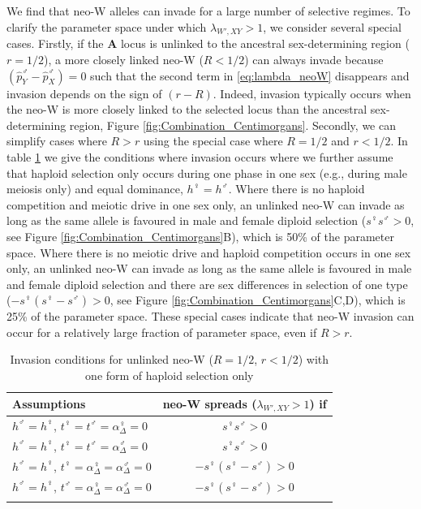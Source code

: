 \documentclass[12pt]{article}
\begin{document}
We find that neo-W alleles can invade for a large number of selective regimes. 
To clarify the parameter space under which $\lambda_{W',XY}>1$, we consider several special cases. 
Firstly, if the \textbf{A} locus is unlinked to the ancestral sex-determining region ($r=1/2$), a more closely linked neo-W ($R<1/2$) can always invade because $\left( \hat{p}^\male_Y-\hat{p}^\male_X \right)=0$ such that the second term in \eqref{eq:lambda_neoW} disappears and invasion depends on the sign of $(r-R)$. 
Indeed, invasion typically occurs when the neo-W is more closely linked to the selected locus than the ancestral sex-determining region, Figure \ref{fig:Combination_Centimorgans}.
Secondly, we can simplify cases where $R>r$ using the special case where $R=1/2$ and $r<1/2$. 
In table \ref{tab:specialcases} we give the conditions where invasion occurs where we further assume that haploid selection only occurs during one phase in one sex (e.g., during male meiosis only) and equal dominance, $h^\female=h^\male$. 
Where there is no haploid competition and meiotic drive in one sex only, an unlinked neo-W can invade as long as the same allele is favoured in male and female diploid selection ($s^\female s^\male>0$, see Figure \ref{fig:Combination_Centimorgans}B), which is 50\% of the parameter space. 
Where there is no meiotic drive and haploid competition occurs in one sex only, an unlinked neo-W can invade as long as the same allele is favoured in male and female diploid selection and there are sex differences in selection of one type ($-s^\female(s^\female-s^\male)>0$, see Figure \ref{fig:Combination_Centimorgans}C,D), which is 25\% of the parameter space. 
These special cases indicate that neo-W invasion can occur for a relatively large fraction of parameter space, even if $R>r$. 

\begin{table}[ht]
\centering
\smallskip
\caption{Invasion conditions for unlinked neo-W ($R=1/2$, $r<1/2$) with one form of haploid selection only}
\begin{tabular}{l c }
\hline\hline
  Assumptions & neo-W spreads ($\lambda_{W',XY}>1$) if \\ [0.5ex] \hline
  $h^\male=h^\female$, $t^\female=t^\male=\alpha^\female_{\Delta}=0$ & $s^\female s^\male>0$ \\
  $h^\male=h^\female$, $t^\female=t^\male=\alpha^\male_{\Delta}=0$ & $s^\female s^\male>0$ \\
  $h^\male=h^\female$, $t^\female=\alpha^\female_{\Delta}=\alpha^\male_{\Delta}=0$ & $-s^\female(s^\female-s^\male)>0$ \\
  $h^\male=h^\female$, $t^\male=\alpha^\female_{\Delta}=\alpha^\male_{\Delta}=0$ & $-s^\female(s^\female-s^\male)>0$ \\
  \hline \hline
  \label{tab:specialcases}
 \end{tabular}
\end{table}
\end{document}
